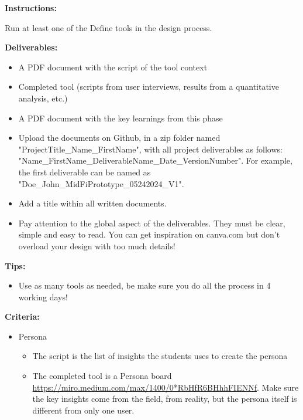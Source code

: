 \makeheaderfiles

\textbf{Instructions:}

Run at least one of the Define tools in the design process.

\textbf{Deliverables:}

\begin{itemize}
\item A PDF document with the script of the tool context
\item Completed tool (scripts from user interviews, results from a quantitative analysis, etc.)
\item A PDF document with the key learnings from this phase
\item Upload the documents on Github, in a zip folder named "ProjectTitle\_Name\_FirstName", with all project deliverables as follows: "Name\_FirstName\_DeliverableName\_Date\_VersionNumber".  For example, the first deliverable can be named as "Doe\_John\_MidFiPrototype\_05242024\_V1".
\item Add a title within all written documents.
\item Pay attention to the global aspect of the deliverables. They must be clear, simple and easy to read. You can get inspiration on canva.com but don't overload your design with too much details!
\end{itemize}

\textbf{Tips:}

\begin{itemize}
\item Use as many tools as needed, be make sure you do all the process in 4 working days!
\end{itemize}

\textbf{Criteria:}

\begin{itemize}
\item Persona
\begin{itemize}
\item The script is the list of insights the students uses to create the persona
\item The completed tool is a Persona board \url{https://miro.medium.com/max/1400/0*RbHfR6BHhhFIENNf}. Make sure the key insights come from the field, from reality, but the persona itself is different from only one user.
\end{itemize}
\end{itemize}

